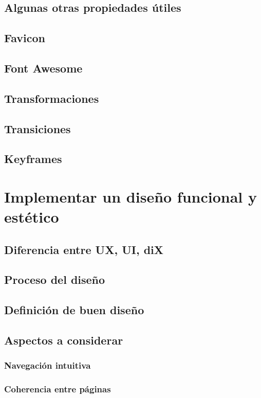 \documentclass[12pt]{report}
\begin{document}
		\subsection{Algunas otras propiedades útiles}
		\subsection{Favicon}
		\subsection{Font Awesome}
		\subsection{Transformaciones}
		\subsection{Transiciones}
		\subsection{Keyframes}
	\section{Implementar un diseño funcional y estético}
		\subsection{Diferencia entre UX, UI, diX}
		\subsection{Proceso del diseño}
		\subsection{Definición de buen diseño}
		\subsection{Aspectos a considerar}
			\subsubsection{Navegación intuitiva}
			\subsubsection{Coherencia entre páginas}
\end{document}
